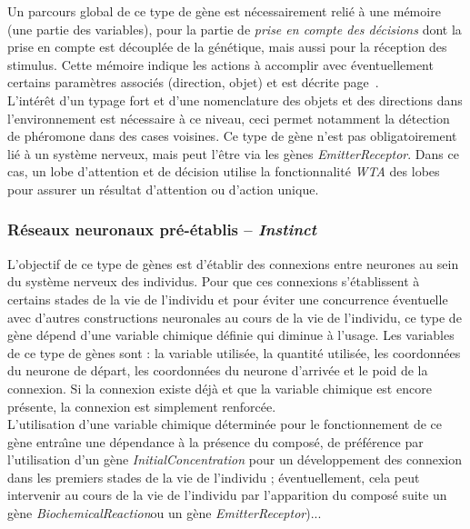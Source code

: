\documentclass[11pt,twoside,a4paper]{article}
\begin{document}
Un parcours global de ce type de g{\`e}ne est n{\'e}cessairement reli{\'e} {\`a} une m{\'e}moire (une partie des variables), pour la partie de \emph{prise en compte des d{\'e}cisions} dont la prise en compte est d{\'e}coupl{\'e}e de la g{\'e}n{\'e}tique, mais aussi pour la r{\'e}ception des stimulus. Cette m{\'e}moire indique les actions {\`a} accomplir avec {\'e}ventuellement certains param{\`e}tres associ{\'e}s (direction, objet) et est d{\'e}crite page~\pageref{tab:NomenclatureStimuliDecision}.~\\

L'int{\'e}r{\^e}t d'un typage fort et d'une nomenclature des objets et des directions dans l'environnement est n{\'e}cessaire {\`a} ce niveau, ceci permet notamment la d{\'e}tection de ph{\'e}romone dans des cases voisines. Ce type de g{\`e}ne n'est pas obligatoirement li{\'e} {\`a} un syst{\`e}me nerveux, mais peut l'{\^e}tre via les g{\`e}nes \emph{EmitterReceptor}. Dans ce cas, un lobe d'attention et de d{\'e}cision utilise la fonctionnalit{\'e} \emph{WTA} des lobes pour assurer un r{\'e}sultat d'attention ou d'action unique. 

\subsubsection{R{\'e}seaux neuronaux pr{\'e}-{\'e}tablis -- \emph{Instinct}}

L'objectif de ce type de g{\`e}nes est d'{\'e}tablir des connexions entre neurones au sein du syst{\`e}me nerveux des individus. Pour que ces connexions s'{\'e}tablissent {\`a} certains stades de la vie de l'individu et pour {\'e}viter une concurrence {\'e}ventuelle avec d'autres constructions neuronales au cours de la vie de l'individu, ce type de g{\`e}ne d{\'e}pend d'une variable chimique d{\'e}finie qui diminue {\`a} l'usage. Les variables de ce type de g{\`e}nes sont : la variable utilis{\'e}e, la quantit{\'e} utilis{\'e}e, les coordonn{\'e}es du neurone de d{\'e}part, les coordonn{\'e}es du neurone d'arriv{\'e}e et le poid de la connexion. Si la connexion existe d{\'e}j{\`a} et que la variable chimique est encore pr{\'e}sente, la connexion est simplement renforc{\'e}e.~\\

L'utilisation d'une variable chimique d{\'e}termin{\'e}e pour le fonctionnement de ce g{\`e}ne entra{\^\i}ne une d{\'e}pendance {\`a} la pr{\'e}sence du compos{\'e}, de pr{\'e}f{\'e}rence par l'utilisation d'un g{\`e}ne \emph{InitialConcentration} pour un d{\'e}veloppement des connexion dans les premiers stades de la vie de l'individu ; {\'e}ventuellement, cela peut intervenir au cours de la vie de l'individu par l'apparition du compos{\'e} suite un g{\`e}ne \emph{BiochemicalReaction}ou un g{\`e}ne \emph{EmitterReceptor})...~\\
\end{document}
